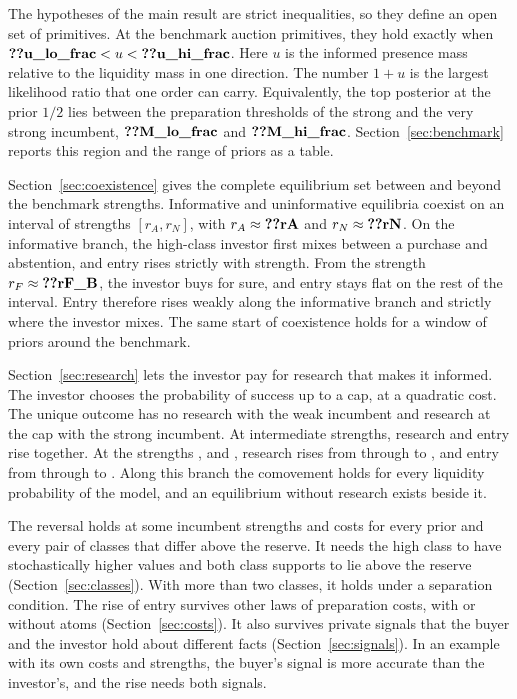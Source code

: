 The hypotheses of the main result are strict inequalities, so they define an open set of primitives. At the
benchmark auction primitives, they hold exactly when \(\reg{u_lo_frac}<u<\reg{u_hi_frac}\). Here \(u\) is the informed
presence mass relative to the liquidity mass in one direction. The number \(1+u\) is the largest likelihood ratio
that one order can carry. Equivalently, the top posterior at the prior \(1/2\) lies between the preparation thresholds of the
strong and the very strong incumbent, \(\reg{M_lo_frac}\) and \(\reg{M_hi_frac}\). Section~\ref{sec:benchmark} reports
this region and the range of priors as a table.

Section~\ref{sec:coexistence} gives the complete equilibrium set between and beyond the benchmark strengths.
Informative and uninformative equilibria coexist on an interval of strengths \([r_A,r_N]\), with
\(r_A\approx\reg{rA}\) and \(r_N\approx\reg{rN}\). On the informative
branch, the high-class investor first mixes between a purchase and abstention, and entry rises strictly with
strength. From the strength \(r_F\approx\reg{rF_B}\), the investor buys for sure, and entry stays flat on the rest
of the interval. Entry therefore rises weakly along the informative branch and strictly where the investor mixes. The
same start of coexistence holds for a window of priors around the benchmark.

Section~\ref{sec:research} lets the investor pay for research that makes it informed. The investor chooses the
probability of success up to a cap, at a quadratic cost. The unique outcome has no research with the weak incumbent
and research at the cap with the strong incumbent. At intermediate strengths, research and entry rise together. At the
strengths ,  and , research rises from  through
 to , and entry from  through  to
. Along this branch the comovement holds for every liquidity probability of the model, and an
equilibrium without research exists beside it.

The reversal holds at some incumbent strengths and costs for every prior and every pair of classes that differ
above the reserve. It needs the high class to have stochastically higher values and both class supports to lie
above the reserve (Section~\ref{sec:classes}). With more than two classes, it holds under a separation
condition. The rise of entry survives other laws of preparation costs, with or without atoms
(Section~\ref{sec:costs}). It also survives private signals that the buyer and the investor hold about different
facts (Section~\ref{sec:signals}). In an example with its own costs and strengths, the buyer's signal is more
accurate than the investor's, and the rise needs both signals.

